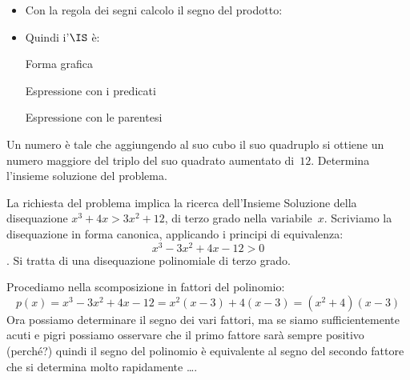 \begin{esempio}
\begin{itemize}
 \item
 \vspace{-1em}
 Con la regola dei segni calcolo il segno del prodotto:

\begin{inaccessibleblock}
  \begin{center}
  \segnoprodottob
  \end{center}
\end{inaccessibleblock}

 \item
 \vspace{-1em}
 Quindi i'\(\IS\) è:\\

  \begin{minipage}{.32\textwidth}
  Forma grafica\\[-1.2em]

\begin{inaccessibleblock}
  \begin{center}
  \end{center}
\end{inaccessibleblock}
\vspace{.1em}

  \end{minipage}
  \begin{minipage}{.32\textwidth}
  Espressione con i predicati\\[2.5em]

  \end{minipage}
  \begin{minipage}{.32\textwidth}
  Espressione con le parentesi\\[2.5em]

  \end{minipage}

\end{itemize}

\end{esempio}

\begin{esempio}
Un numero è tale che aggiungendo al suo cubo il suo quadruplo si ottiene
un numero maggiore del triplo del suo quadrato aumentato di~\(12\). Determina
l'insieme soluzione del problema.

La richiesta del problema implica la ricerca dell'Insieme Soluzione della
disequazione \(x^3+4x>3x^2+12\), di terzo grado nella variabile~\(x\).
Scriviamo la disequazione in forma canonica, applicando i principi di
equivalenza:
\[x^3-3x^2+4x-12>0\].
Si tratta di una disequazione polinomiale di terzo grado.

Procediamo nella scomposizione in fattori del polinomio:
\[p(x)=x^3-3x^2+4x-12 = x^2 \left(x-3\right)+4 \left(x-3\right) =
      \left(x^2+4\right) \left(x-3\right)\]
Ora possiamo determinare il segno dei vari fattori, ma se siamo
sufficientemente acuti e pigri possiamo osservare che il primo fattore sarà
sempre positivo (perché?) quindi il segno del polinomio è equivalente al
segno del secondo fattore che si determina molto rapidamente \dots.
\end{esempio}

